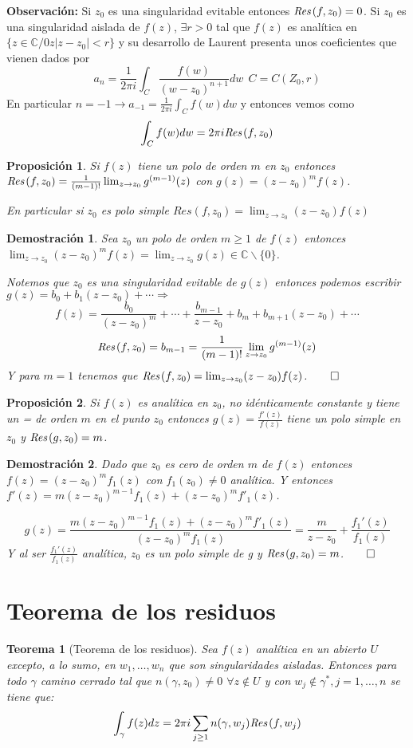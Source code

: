 \documentclass[12pt]{book}
\newtheorem{theorem}{Teorema}[chapter]
\newtheorem{prop}{Proposición}[chapter]
\newtheorem*{dem}{Demostración}
\newcommand{\C}{\mathbb{C}}
\newcommand{\Res}{\emph{Res}\hspace{0.5mm}}
\begin{document}
\textbf{Observación:} Si $z_0$ es una singularidad evitable entonces $\Res(f,z_0) =0$. 
Si $z_0$ es una singularidad aislada de $f(z)$, $\exists r>0$ tal que $f(z)$ es analítica en $\{z\in\C / 0z|z-z_0|<r\}$ y su desarrollo de Laurent presenta unos coeficientes que vienen dados por 
$$
a_n = \frac{1}{2\pi i}\int_C \frac{f(w)}{(w-z_0)^{n+1}}dw\ \ C= C(Z_0,r)
$$
En particular $n=-1 \longrightarrow a_{-1} = \frac{1}{2\pi i}\int_C f(w)dw$ y entonces vemos como
$$\int_C f(w)dw = 2\pi i \Res(f,z_0)$$

\begin{prop}
Si $f(z)$ tiene un  polo de orden $m$ en $z_0$ entonces $\Res(f,z_0)= \frac{1}{(m-1)!}\lim_{z\to z_0}g^{(m-1)}(z)$ con $g(z) = (z-z_0)^mf(z)$.

En particular si $z_0$ es polo simple $Res(f,z_0) = \lim_{z\to z_0} (z-z_0)f(z)$
\end{prop}

\begin{dem}
Sea $z_0$ un polo de orden $m\geq 1$ de $f(z)$ entonces $\lim_{z\to z_0}(z-z_0)^m f(z) = \lim_{z\to z_0} g(z) \in \C\backslash\{0\}$.

Notemos que $z_0$ es una singularidad evitable de $g(z)$ entonces podemos escribir $g(z) = b_0 + b_1(z-z_0) + \cdots \Rightarrow$
$$f(z) = \frac{b_0}{(z-z_0)^m}+ \cdots + \frac{b_{m-1}}{z-z_0}+ b_m + b_{m+1}(z-z_0) + \cdots$$
$$\Res(f,z_0) = b_{m-1} = \frac{1}{(m-1)!}\lim_{z\to z_0} g^{(m-1)}(z)$$
Y para $m =1$ tenemos que $\Res(f,z_0) = \lim_{z\to z_0} (z-z_0)f(z)$.$\qed$
\end{dem}


\begin{prop}
Si $f(z)$ es analítica en $z_0$, no idénticamente constante y tiene un = de orden $m$ en el punto $z_0$ entonces $g(z) =  \frac{f'(z)}{f(z)}$ tiene un polo simple en $z_0$ y $\Res(g,z_0) = m$.
\end{prop}

\begin{dem}
Dado que $z_0$ es cero de orden $m$ de $f(z)$ entonces $f(z) = (z-z_0)^mf_1(z)$ con $f_1(z_0)\neq 0$ analítica.
Y entonces $f'(z)  = m(z-z_0)^{m-1}f_1(z) + (z-z_0)^mf'_1(z)$.

$$g(z) = \frac{m(z-z_0)^{m-1}f_1(z) + (z-z_0)^mf'_1(z)}{(z-z_0)^mf_1(z)} = \frac{m}{z-z_0}+\frac{f_1'(z)}{f_1(z)}$$
Y al ser $\frac{f_1'(z)}{f_1(z)}$ analítica, $z_0$ es un polo simple de g y $\Res(g,z_0) = m$.$\qed$
\end{dem}
\section{Teorema de los residuos}
\begin{theorem}[Teorema de los residuos]
Sea $f(z)$ analítica en un abierto $U$ excepto, a lo sumo, en $w_1,\ldots,w_n$ que son singularidades aisladas. Entonces para todo $\gamma$ camino cerrado tal que $n(\gamma,z_0) \neq 0$ $\forall z\notin U$ y con $w_j \notin \gamma^*, j= 1,\ldots,n$ se tiene que:
$$\int_\gamma f(z)dz = 2\pi i \sum_{j\geq 1} n(\gamma,w_j) \Res(f,w_j)$$
\end{theorem}
\end{document}

